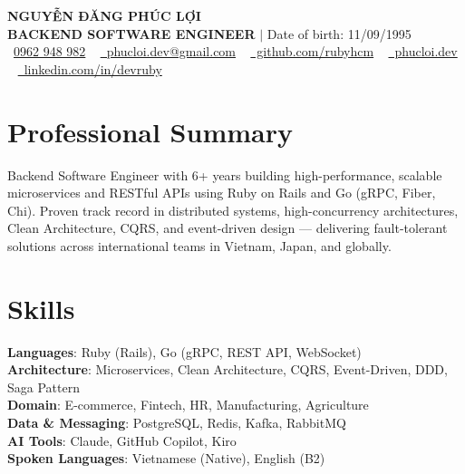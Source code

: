 \documentclass[a4paper,11pt]{article}
\begin{document}
\begin{center}
    {\Huge \textbf{\textcolor{PrimaryColor}{NGUYỄN ĐĂNG PHÚC LỢI}}} \\ \vspace{5pt}
    \small \textbf{\textcolor{SecondaryColor}{BACKEND SOFTWARE ENGINEER}} $|$ \small Date of birth: 11/09/1995 \\ \vspace{4pt}
    \small \raisebox{-0.1\height}{\textcolor{PrimaryColor}{\faPhone}}\ \href{tel:0962948982}{0962 948 982} ~
    \href{mailto:phucloi.dev@gmail.com}{\raisebox{-0.2\height}{\textcolor{PrimaryColor}{\faEnvelope}}\ phucloi.dev@gmail.com} ~
    \href{https://github.com/rubyhcm}{\raisebox{-0.2\height}{\textcolor{PrimaryColor}{\faGithub}}\ github.com/rubyhcm} ~
    \href{https://phucloi.dev/}{\raisebox{-0.2\height}{\textcolor{PrimaryColor}{\faGlobe}}\ phucloi.dev} ~
    \href{https://www.linkedin.com/in/devruby/}{\raisebox{-0.2\height}{\textcolor{PrimaryColor}{\faLinkedin}}\ linkedin.com/in/devruby}
\end{center}

\section{Professional Summary}
\small{Backend Software Engineer with 6+ years building high-performance, scalable microservices and RESTful APIs using Ruby on Rails and Go (gRPC, Fiber, Chi). Proven track record in distributed systems, high-concurrency architectures, Clean Architecture, CQRS, and event-driven design — delivering fault-tolerant solutions across international teams in Vietnam, Japan, and globally.}
\vspace{-5pt}

\section{Skills}
 \begin{itemize}[leftmargin=0.15in, label={}]
    \small{\item{
     \textbf{Languages}{: Ruby (Rails), Go (gRPC, REST API, WebSocket)} \\ \vspace{1pt}
     \textbf{Architecture}{: Microservices, Clean Architecture, CQRS, Event-Driven, DDD, Saga Pattern} \\ \vspace{1pt}
     \textbf{Domain}{: E-commerce, Fintech, HR, Manufacturing, Agriculture} \\ \vspace{1pt}
     \textbf{Data \& Messaging}{: PostgreSQL, Redis, Kafka, RabbitMQ} \\ \vspace{1pt}
     \textbf{AI Tools}{: Claude, GitHub Copilot, Kiro} \\ \vspace{1pt}
     \textbf{Spoken Languages}{: Vietnamese (Native), English (B2)}
    }}
 \end{itemize}
\vspace{-5pt}
\end{document}
